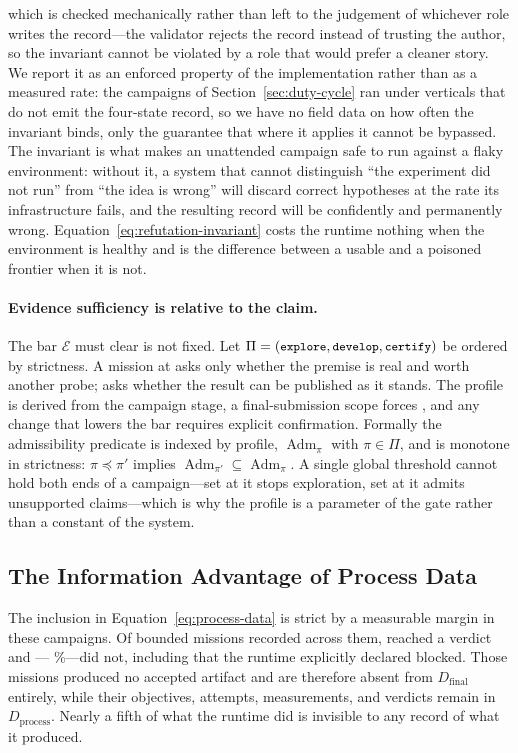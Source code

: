 which is checked mechanically rather than left to the judgement of whichever role
writes the record---the validator rejects the record instead of trusting the author,
so the invariant cannot be violated by a role that would prefer a cleaner story. We
report it as an enforced property of the implementation rather than as a measured
rate: the campaigns of Section~\ref{sec:duty-cycle} ran under verticals that do not
emit the four-state record, so we have no field data on how often the invariant
binds, only the guarantee that where it applies it cannot be bypassed. The invariant is what makes an unattended campaign safe to run
against a flaky environment: without it, a system that cannot distinguish ``the
experiment did not run'' from ``the idea is wrong'' will discard correct hypotheses
at the rate its infrastructure fails, and the resulting record will be confidently
and permanently wrong. Equation~\ref{eq:refutation-invariant} costs the runtime
nothing when the environment is healthy and is the difference between a usable and a
poisoned frontier when it is not.

\paragraph{Evidence sufficiency is relative to the claim.}
The bar $\mathcal{E}$ must clear is not fixed. Let $\Pi=(\texttt{\small explore},
\texttt{\small develop},\texttt{\small certify})$ be ordered by strictness. A mission at
 asks only whether the premise is real and worth another probe;
 asks whether the result can be published as it stands. The profile is
derived from the campaign stage, a final-submission scope forces , and
any change that lowers the bar requires explicit confirmation. Formally the
admissibility predicate is indexed by profile, $\operatorname{Adm}_{\pi}$ with
$\pi\in\Pi$, and is monotone in strictness: $\pi\preceq\pi'$ implies
$\operatorname{Adm}_{\pi'}\subseteq\operatorname{Adm}_{\pi}$. A single global
threshold cannot hold both ends of a campaign---set at  it stops
exploration, set at  it admits unsupported claims---which is why the
profile is a parameter of the gate rather than a constant of the system.

\subsection{The Information Advantage of Process Data}

The inclusion in Equation~\ref{eq:process-data} is strict by a measurable margin in
these campaigns. Of \MissionTotal{} bounded missions recorded across them,
\MissionDone{} reached a  verdict and \MissionNonDone{}---%
\MissionNonDonePct\%---did not, including \MissionBlocked{} that the runtime
explicitly declared blocked. Those missions produced no accepted artifact and are
therefore absent from $D_{\mathrm{final}}$ entirely, while their objectives,
attempts, measurements, and verdicts remain in $D_{\mathrm{process}}$. Nearly a fifth
of what the runtime did is invisible to any record of what it produced.

